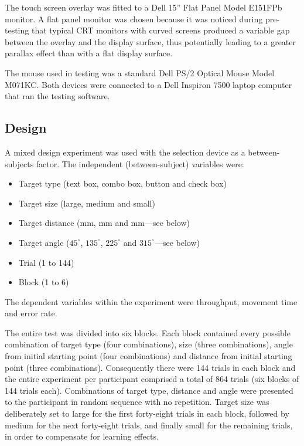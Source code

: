 \documentclass{elsart}
\begin{document}
The touch screen overlay was fitted to a Dell 15'' Flat Panel Model
E151FPb monitor. A flat panel monitor was chosen because it was noticed
during pre-testing that typical CRT monitors with curved screens
produced a variable gap between the overlay and the display surface,
thus potentially leading to a greater parallax effect than with a flat
display surface.

The mouse used in testing was a standard Dell PS/2 Optical Mouse Model
M071KC. Both devices were connected to a Dell Inspiron 7500 laptop
computer that ran the testing software.


\subsection{Design}
\label{sec-method-design}

A mixed design experiment was used with the selection device as a
between-subjects factor. The independent (between-subject) variables
were:
\begin{itemize}

	\item Target type (text box, combo box, button and check box)

	\item Target size (large, medium and small)

	\item Target distance (\unit[40]{mm}, \unit[80]{mm} and
	\unit[160]{mm}---see below)

	\item Target angle (\(45^{\circ}\), \(135^{\circ}\), \(225^{\circ}\)
	and \(315^{\circ}\)---see below)

	\item Trial (1 to 144)

	\item Block (1 to 6)

\end{itemize}
The dependent variables within the experiment were throughput, movement
time and error rate.

The entire test was divided into six blocks. Each block contained every
possible combination of target type (four combinations), size (three
combinations), angle from initial starting point (four combinations) and
distance from initial starting point (three combinations). Consequently
there were 144 trials in each block and the entire experiment per
participant comprised a total of 864 trials (six blocks of 144 trials
each). Combinations of target type, distance and angle were presented to
the participant in random sequence with no repetition. Target size was
deliberately set to large for the first forty-eight trials in each block,
followed by medium for the next forty-eight trials, and finally small for
the remaining trials, in order to compensate for learning effects.
\end{document}
